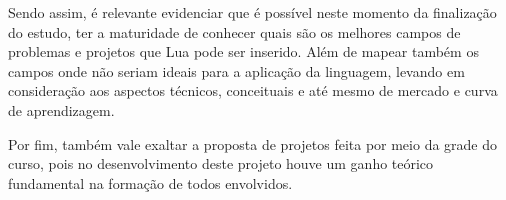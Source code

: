 \documentclass[
12pt, %
openright, %
oneside, %
a4paper, %
english, %
brazil, %
]{abntex2}
\begin{document}
Sendo assim, é relevante evidenciar que é possível neste momento da finalização do estudo, ter a maturidade de conhecer quais são os melhores campos de problemas e projetos que Lua pode ser inserido. Além de mapear também os campos onde não seriam ideais para a aplicação da linguagem, levando em consideração aos aspectos técnicos, conceituais e até mesmo de mercado e curva de aprendizagem.

Por fim, também vale exaltar a proposta de projetos feita por meio da grade do curso, pois no desenvolvimento deste projeto houve um ganho teórico fundamental na formação de todos envolvidos.

\postextual













\end{document}
